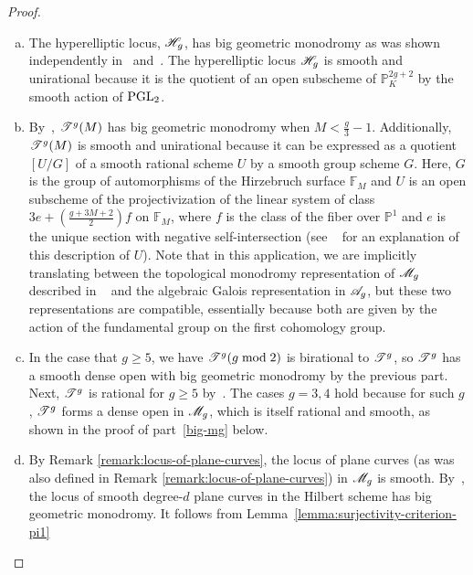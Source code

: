 \begin{proof}
\begin{enumerate}[(a)]
              \item The hyperelliptic locus, $\mathscr H_{g}$, has big geometric monodromy as was shown independently in~\cite[Lemma 8.12]{mumford:tata-lectures-on-theta-ii} and~\cite[Th\'eor\`eme 1]{acampo:tresses-monodromie-et-le-groupe-symplectique}.
	       The hyperelliptic locus $\mathscr H_{g}$ is smooth and unirational because it is the quotient of an open subscheme of
	       $\mathbb P^{2g+2}_K$ by the smooth action of $\operatorname{PGL}_2$.
\item By~\cite[Theorem, p.~2]{bolognesi2016mapping}, $\mathscr T^{g} (M)$ has big geometric monodromy when $M < \frac{g}{3}-1$.
	      Additionally, $\mathscr T^{g}(M)$ is smooth and unirational because it can be expressed as a quotient
	      $[U/G]$ of a smooth rational scheme $U$ by a smooth group scheme $G$.
	      Here, $G$ is the group of automorphisms of the Hirzebruch surface $\mathbb F_M$
	      and $U$ is an open subscheme of the projectivization of the linear system of class $3e + \left(\frac{g + 3M + 2}{2}\right) f$ on $\mathbb F_M$, where $f$ is the class of the fiber over $\mathbb P^1$ and $e$
	      is the unique section with negative self-intersection (see ~\cite[p.~8]{bolognesi2016mapping} for an explanation
		of this description of $U$).
	       Note that in this application, we are implicitly translating between
the topological monodromy representation of ${\mathscr M_g}$ described in ~\cite[Theorem, p.~2]{bolognesi2016mapping} and the algebraic Galois representation in
${\mathscr A_g}$, but these two representations are compatible, essentially because
both are given by the action of the fundamental group on the first cohomology
group.
\item In the case that $g \geq 5$, we have $\mathscr T^{g}(g \bmod 2)$ is birational to $\mathscr T^{g}$, so $\mathscr T^{g}$
	has a smooth dense open with big geometric monodromy by the previous part.
	Next, $\mathscr T^{g}$ is rational for $g \geq 5$ by~\cite[Theorem, p.~1]{ma2014rationality}.
	The cases $g = 3, 4$ hold because for such $g$, $\mathscr T^{g}$ forms a dense open in ${\mathscr M_g}$, which is itself rational and smooth,
	as shown in the proof of part~\ref{big-mg} below.
\item By Remark \ref{remark:locus-of-plane-curves}, the locus of plane curves (as was also defined in Remark \ref{remark:locus-of-plane-curves}) in ${\mathscr M_g}$ is smooth.
By~\cite[Th\'{e}or\`{e}me 4]{beauville1986groupe}, the locus of smooth degree-$d$ plane curves in the Hilbert scheme has big geometric monodromy. 
It follows from Lemma~\ref{lemma:surjectivity-criterion-pi1}

\end{enumerate}
\end{proof}
